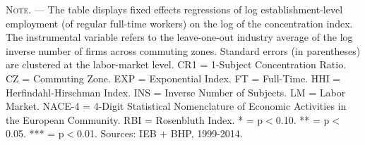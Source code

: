 \documentclass[11pt,oneside,reqno,xcolor=dvipsnames]{article} %
\begin{document}
\begin{appendix}
\begin{refsection}
\begin{landscape}
\begin{table}[!ht]
{\begin{threeparttable}
\begin{tablenotes}
\item \footnotesize \textsc{Note. ---} The table displays fixed effects regressions of log establishment-level employment (of regular full-time workers) on the log of the concentration index. The instrumental variable refers to the leave-one-out industry average of the log inverse number of firms across commuting zones. Standard errors (in parentheses) are clustered at the labor-market level. CR1 = 1-Subject Concentration Ratio. CZ = Commuting Zone. EXP = Exponential Index. FT = Full-Time. HHI = Herfindahl-Hirschman Index. INS = Inverse Number of Subjects. LM = Labor Market. NACE-4 = 4-Digit Statistical Nomenclature of Economic Activities in the European Community. RBI = Rosenbluth Index. * = p$<$0.10. ** = p$<$0.05. *** = p$<$0.01. Sources: IEB $\plus$ BHP, 1999-2014.
\end{tablenotes}
\end{threeparttable}
}
\end{table}



\vspace*{\fill}
\clearpage
\vspace*{\fill}



\end{landscape}
\end{refsection}
\end{appendix}
\end{document}
